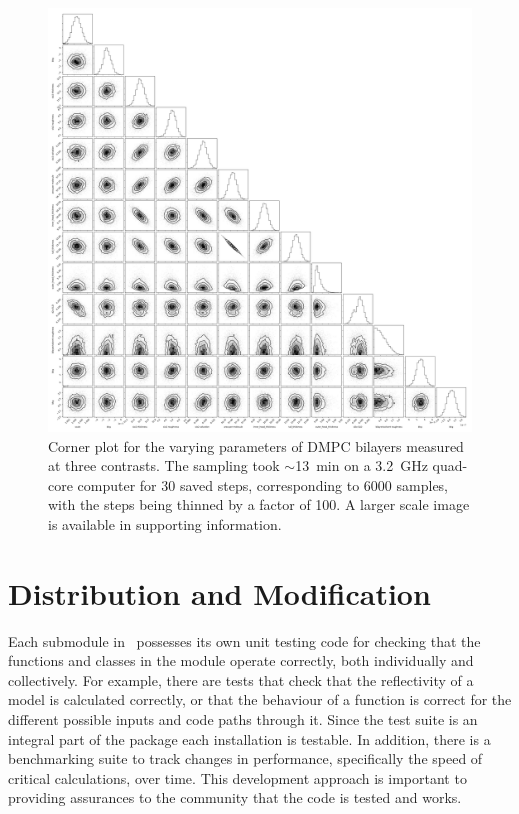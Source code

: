 \documentclass[pdf,preprint]{iucr}
\begin{document}
\begin{figure}
  \includegraphics[width=175mm]{./supporting_information/corner.pdf}
  \caption{Corner plot for the varying parameters of DMPC bilayers measured at three contrasts. The sampling took $\sim$\SI{13}{\minute} on a \SI{3.2}{GHz} quad-core computer for 30 saved steps, corresponding to 6000 samples, with the steps being thinned by a factor of 100. A larger scale image is available in supporting information.}
  \label{fig:corner}
\end{figure}

 
\section{Distribution and Modification}

Each submodule in \ possesses its own unit testing code for checking that the functions and classes in the module operate correctly, both individually and collectively. For example, there are tests that check that the reflectivity of a model is calculated correctly, or that the behaviour of a function is correct for the different possible inputs and code paths through it. Since the test suite is an integral part of the package each installation is testable. In addition, there is a benchmarking suite to track changes in performance, specifically the speed of critical calculations, over time. This development approach is important to providing assurances to the community that the code is tested and works.
\end{document}
